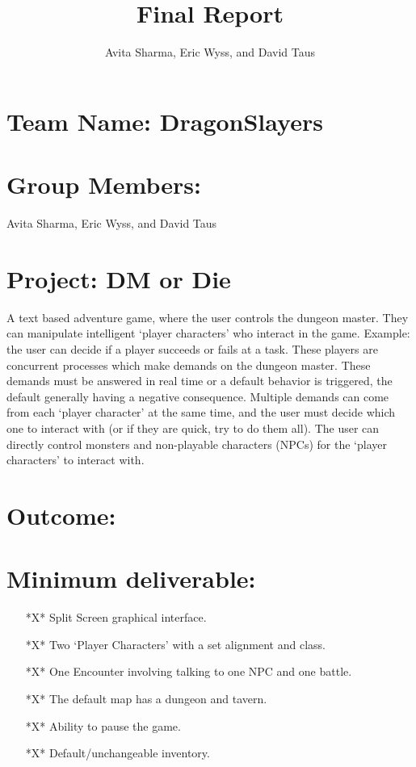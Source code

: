\documentclass{article}
\author{Avita Sharma, Eric Wyss, and David Taus}
\title{\textbf{Final Report}}
\date{}
\theoremstyle{definition}
\begin{document}
\maketitle
\section*{Team Name: DragonSlayers}
\section*{Group Members:}
 Avita Sharma, Eric Wyss, and David Taus
\section*{Project: DM or Die}

A text based adventure game, where the user controls the dungeon master. They can 
manipulate intelligent `player characters' who interact in the game. Example: the
user can decide if a player succeeds or fails at a task. These players are 
concurrent processes which make demands on the dungeon master. These demands
must be answered in real time or a default behavior is triggered, the default
generally having a negative consequence. Multiple demands can come from each 
`player character' at the same time, and the user must decide which one to interact 
with (or if they are quick, try to do them all). The user can directly control
monsters and non-playable characters (NPCs) for the `player characters' to interact 
with.
\section*{\huge{Outcome:}}
\section*{Minimum deliverable:}
\begin{enumerate}
\item [*X*] Split Screen graphical interface.
\item [*X*] Two `Player Characters' with a set alignment and class.
\item [*X*] One Encounter involving talking to one NPC and one battle. 
\item [*X*] The default map has a dungeon and tavern.
\item [*X*] Ability to pause the game.
\item [*X*] Default/unchangeable inventory.
\end{enumerate}
\end{document}
